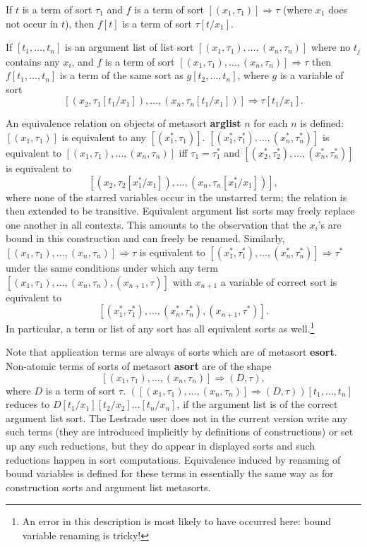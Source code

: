 \documentclass[12pt]{article}
\begin{document}
If $t$ is a term of sort $\tau_1$ and $f$ is a term of sort $[(x_1,\tau_1)] \Rightarrow \tau$ (where $x_1$ does not occur in $t$), then $f[t]$ is a term of sort $\tau[t/x_1]$.

If $[t_1,\ldots,t_n]$ is an argument list of list sort $[(x_1,\tau_1),\ldots,(x_n,\tau_n)]$  where no $t_j$ contains any $x_i$, and $f$ is a term of sort $[(x_1,\tau_1),\ldots,(x_n,\tau_n)] \Rightarrow \tau$
then $f[t_1,\ldots,t_n]$ is a term of the same sort as $g[t_2,\ldots,t_n]$, where $g$ is a variable of sort $$[(x_2,\tau_1[t_1/x_1]),\ldots,(x_n,\tau_n[t_1/x_1])] \Rightarrow \tau[t_1/x_1].$$

An equivalence relation on objects of metasort {\bf arglist} $n$ for each $n$ is defined:  $[(x_1,\tau_1)]$ is equivalent to any $[(x_1^*,\tau_1)]$.  $[(x_1^*,\tau_1^*),\ldots,(x_n^*,\tau_n^*)]$ is equivalent  to $[(x_1,\tau_1),\ldots,(x_n,\tau_n)]$ iff $\tau_1=\tau_1^*$ and $[(x_2^*,\tau_2^*),\ldots,(x_n^*,\tau_n^*)]$ is equivalent  to $$[(x_2,\tau_2[x_1^*/x_1]),\ldots,(x_n,\tau_n[x_1^*/x_1])],$$ where none of the starred variables occur in the unstarred term; the relation is then extended to be transitive.   Equivalent argument list sorts may freely replace one another in all contexts.  This amounts to the observation that the $x_i$'s are bound in this construction and can freely be renamed.  Similarly, $[(x_1,\tau_1),\ldots,(x_n,\tau_n)] \Rightarrow \tau$ is equivalent to $[(x_1^*,\tau_1^*),\ldots,(x_n^*,\tau_n^*)] \Rightarrow \tau^*$ under the same conditions under which any term
$[(x_1,\tau_1),\ldots,(x_n,\tau_n),(x_{n+1},\tau)]$ with $x_{n+1}$ a variable of correct sort is equivalent to $$[(x_1^*,\tau_1^*),\ldots,(x_n^*,\tau_n^*),(x_{n+1},\tau^*)].$$  In particular, a term or list of any sort has all equivalent sorts as well.\footnote{An error in this description is most likely to have occurred here:  bound variable renaming is tricky!}

Note that application terms are always of sorts which are of metasort {\bf esort}.  Non-atomic terms of sorts of metasort {\bf asort} are of the shape $$[(x_1,\tau_1),\ldots,(x_n,\tau_n)] \Rightarrow (D,\tau),$$ where $D$ is a term of sort $\tau$.  $([(x_1,\tau_1),\ldots,(x_n,\tau_n)] \Rightarrow (D,\tau))[t_1,\ldots,t_n]$ reduces to $D[t_1/x_1][t_2/x_2]\ldots[t_n/x_n]$, if the argument list is of the correct argument list sort. The Lestrade user does not in the current version write any such terms (they are introduced implicitly by definitions of constructions) or set up any such reductions, but they do appear in displayed sorts and such reductions happen in sort computations.   Equivalence induced by renaming of bound variables is defined for these terms in essentially the same way as for construction sorts and argument list metasorts.
\end{document}
